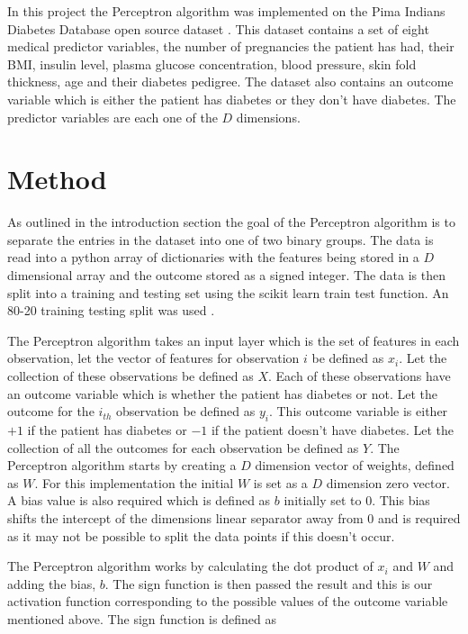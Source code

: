 \documentclass[10pt,twocolumn,letterpaper]{article}
\begin{document}
In this project the Perceptron algorithm was implemented on the Pima Indians Diabetes Database
open source dataset \cite{kagglePimaIndians}. This dataset contains a set of eight medical
predictor variables, the number of pregnancies the patient has had, their BMI, insulin level,
plasma glucose concentration, blood pressure, skin fold thickness, age and their diabetes
pedigree. The dataset also contains an outcome variable which is either the patient has
diabetes or they don't have diabetes. The predictor variables are each one of the $D$
dimensions.

\section{Method}

As outlined in the introduction section the goal of the Perceptron algorithm is to separate
the entries in the dataset into one of two binary groups. The data is read into a python array
of dictionaries with the features being stored in a $D$ dimensional array and the outcome
stored as a signed integer. The data is then split into a training and testing set using the
scikit learn train test function. An 80-20 training testing split was used \cite{gholamy_why_nodate}.

The Perceptron algorithm takes an input layer which is the set of features in each observation, let
the vector of features for observation $i$ be defined as $x_i$. Let the collection of these observations
be defined as $X$. Each of these observations have an outcome variable which is whether the patient has
diabetes or not. Let the outcome for the $i_{th}$ observation be defined as $y_i$. This outcome variable
is either $+1$ if the patient has diabetes or $-1$ if the patient doesn't have diabetes. Let the collection
of all the outcomes for each observation be defined as $Y$. The Perceptron algorithm starts by creating a $D$
dimension vector of weights, defined as $W$. For this implementation the initial $W$ is set as a $D$ dimension
zero vector. A bias value is also required which is defined as $b$ initially set to $0$. This bias shifts the
intercept of the dimensions linear separator away from $0$ and is required as it may not be possible to
split the data points if this doesn't occur.

The Perceptron algorithm works by calculating the dot product of $x_i$ and $W$ and adding the bias, $b$.
The sign function is then passed the result and this is our activation function corresponding to the possible
values of the outcome variable mentioned above. The sign function is defined as
\end{document}
